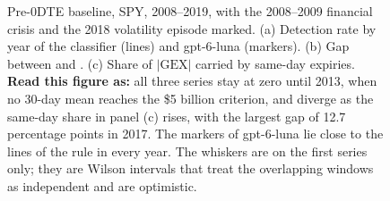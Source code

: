 \begin{figure}[H]
\centering
\resultfigure{\figDeep}
\caption{Pre-0DTE baseline, SPY, 2008--2019, with the 2008--2009 financial crisis and the 2018 volatility episode marked. (a) Detection rate by year of the classifier (lines) and gpt-6-luna (markers). (b) Gap between  and . (c) Share of $|\mathrm{GEX}|$ carried by same-day expiries. \textbf{Read this figure as:} all three series stay at zero until 2013, when no 30-day mean reaches the \$5 billion criterion, and diverge as the same-day share in panel (c) rises, with the largest gap of 12.7 percentage points in 2017. The markers of gpt-6-luna lie close to the lines of the rule in every year. The whiskers are on the first series only; they are Wilson intervals that treat the overlapping windows as independent and are optimistic.}
\label{fig:deep}
\end{figure}
